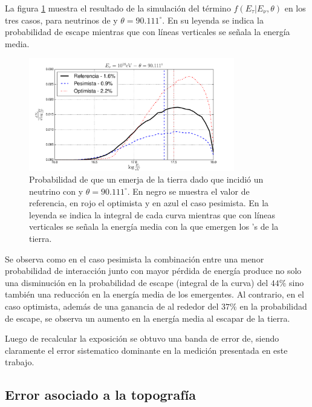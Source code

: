 	La figura \ref{fig:pdfSyst} muestra el resultado de la simulación del término $f(E_\tau|E_\nu,\theta)$ en los tres casos, para neutrinos de  y $\theta=90.111^\circ$.
	En su leyenda se indica la probabilidad de escape mientras que con líneas verticales se señala la energía media.
	\begin{figure}[ht!]
		\begin{center}
			\includegraphics[width=0.8\textwidth]{fig/resultadosAuger/pdfSyst}
			\caption{Probabilidad de que un \tauon{} emerja de la tierra dado que incidió un neutrino con  y $\theta=90.111^\circ$. En negro se muestra el valor de referencia, en rojo el optimista y en azul el caso pesimista. En la leyenda se indica la integral de cada curva mientras que con líneas verticales se señala la energía media con la que emergen los \tauon{}'s de la tierra.}
			\label{fig:pdfSyst}
		\end{center}
	\end{figure}
	Se observa como en el caso pesimista la combinación entre una menor probabilidad de interacción junto con mayor pérdida de energía produce no solo una disminución en la probabilidad de escape (integral de la curva) del $44\%$ sino también una reducción en la energía media de los \tauon{} emergentes.
	Al contrario, en el caso optimista, además de una ganancia de al rededor del $37\%$ en la probabilidad de escape, se observa un aumento en la energía media al escapar de la tierra.
	
	Luego de recalcular la exposición se obtuvo una banda de error de\linebreak {}, siendo claramente el error sistematico dominante en la medici\'on presentada en este trabajo.
	
	\subsection{Error asociado a la topografía }
	
